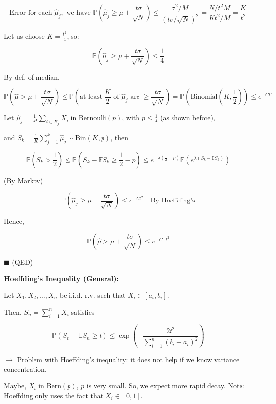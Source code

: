 \documentclass[12pt]{article}
\begin{document}
\[
\text{Error for each } \hat{\mu}_j, \text{ we have } \mathbb{P}\left(\hat{\mu}_j \geq \mu + \frac{t \sigma}{\sqrt{N}}\right) \leq \frac{\sigma^2/M}{(t \sigma/\sqrt{N})^2} = \frac{N/t^2 M}{K t^2/M} = \frac{K}{t^2}
\]

Let us choose \( K = \frac{t^2}{4} \), so:

\[
\mathbb{P}\left(\hat{\mu}_j \geq \mu + \frac{t \sigma}{\sqrt{N}}\right) \leq \frac{1}{4}
\]


By def. of median,

\[
\mathbb{P}\left(\hat{\mu} > \mu + \frac{t \sigma}{\sqrt{N}}\right) \leq \mathbb{P}\left(\text{at least } \frac{K}{2} \text{ of } \hat{\mu}_j \text{ are } \geq \frac{t \sigma}{\sqrt{N}}\right) = \mathbb{P}\left(\text{Binomial}\left(K, \frac{1}{2}\right)\right) \leq e^{-Ct^2}
\]

Let \( \hat{\mu}_j = \frac{1}{M} \sum_{i \in B_j} X_i \) in Bernoulli\((p)\), with \( p \leq \frac{1}{4} \) (as shown before),

and \( S_k = \frac{1}{K} \sum_{j=1}^{k} \hat{\mu}_j \sim \text{Bin}(K, p) \), then

\[
\mathbb{P}\left(S_k > \frac{1}{2}\right) \leq \mathbb{P}\left(S_k - \mathbb{E}S_k \geq \frac{1}{2} - p\right) \leq e^{-\lambda \left(\frac{1}{2} - p\right)} \mathbb{E} \left(e^{\lambda(S_k - \mathbb{E}S_k)}\right)
\]

(By Markov)

\[
\mathbb{P}\left(\hat{\mu}_j \geq \mu + \frac{t \sigma}{\sqrt{N}}\right) \leq e^{-Ct^2} \quad \text{By Hoeffding's}
\]

Hence,

\[
\mathbb{P}\left(\hat{\mu} > \mu + \frac{t \sigma}{\sqrt{N}}\right) \leq e^{-C \cdot t^2}
\]

\(\blacksquare\) (QED)

\textbf{Hoeffding's Inequality (General):}

Let \( X_1, X_2, \dots, X_n \) be i.i.d. r.v. such that \( X_i \in [a_i, b_i] \).

Then, \( S_n = \sum_{i=1}^{n} X_i \) satisfies 

\[
\mathbb{P}\left( S_n - \mathbb{E} S_n \geq t\right) \leq \exp\left(-\frac{2 t^2}{\sum_{i=1}^{n} (b_i - a_i)^2}\right)
\]

\(\rightarrow\) Problem with Hoeffding's inequality: it does not help if we know variance concentration. 

Maybe, \( X_i \) in Bern\((p)\), \( p \) is very small. So, we expect more rapid decay. Note: Hoeffding only uses the fact that \( X_i \in [0,1] \).
\end{document}
